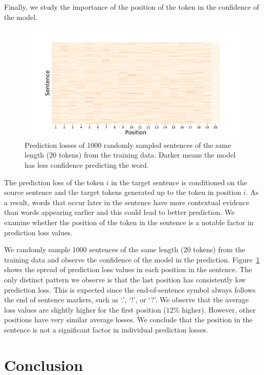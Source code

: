 Finally, we study the importance of the position of the token in the confidence of the model.
\begin{figure}[htb!]
\begin{center}
\includegraphics[width=\textwidth]{05-research-03/figs/lossesotro}
\caption{Prediction losses of 1000 randomly sampled sentences of the same length (20 tokens) from the training data. Darker means the model has less confidence predicting the word. \label{losepos}}
\end{center}
\end{figure}
The prediction loss of the token $i$ in the target sentence is conditioned on the source sentence and the target tokens generated up to the token in position $i$.
As a result, words that occur later in the sentence have more contextual evidence than words appearing earlier and this could lead to better prediction. 
We examine whether the position of the token in the sentence is a notable factor in prediction loss values.

We randomly sample 1000 sentences of the same length (20 tokens) from the training data and observe the confidence of the model in the prediction. 
Figure~\ref{losepos} shows the spread of prediction loss values in each position in the sentence. 
The only distinct pattern we observe is that the last position has consistently low prediction loss.
This is expected since the end-of-sentence symbol always follows the end of sentence markers, such as `.', `!', or `?'.
We observe that the average loss values are slightly higher for the first position ($12\%$ higher). 
However, other positions have very similar average losses.  
We conclude that the position in the sentence is not a significant factor in individual prediction losses.


\section{Conclusion} \label{btconc}

